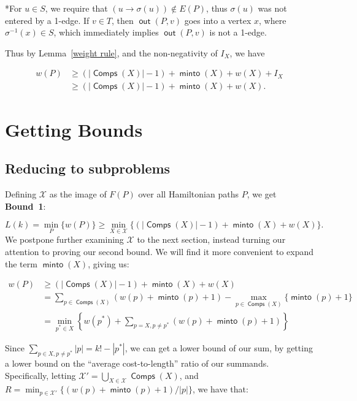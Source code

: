 \documentclass{article}
\DeclareMathOperator{\minto}{\bm{\mathsf{minto}}}
\DeclareMathOperator{\out}{\bm{\mathsf{out}}}
\DeclareMathOperator{\Comp}{\bm{\mathsf{Comps}}}
\newcommand{\edit}[1]{}%
\newcommand{\dc}[1]{}%
\begin{document}
*For $u \in S$, we require that $(u \to \sigma(u)) \not \in E(P)$, thus $\sigma(u)$ was not entered by a 1-edge. If $v \in T$, then $\out(P,v)$ goes into a vertex $x$, where $\sigma^{-1}(x) \in S$, which immediately implies $\out(P,v)$ is not a 1-edge.

\vspace{1.75em}

Thus by Lemma~\ref{weight rule}, and the non-negativity of $I_X$, we have

\begin{align*} w(P) &\geq (|\Comp(X)|-1)+\minto(X)+w(X)+I_X\\
&\geq (|\Comp(X)|-1)+\minto(X)+w(X).\end{align*}

\section{Getting Bounds} \label{reductions}

\subsection{Reducing to subproblems} \label{to subproblems}

Defining $\mathcal{X}$ as the image of $F(P)$ over all Hamiltonian paths $P$, we get \textbf{Bound~1}\dc{ label/ref}:

\[L(k) = \min_{P} \{w(P)\} \geq \min_{X \in \mathcal{X}} \{(|\Comp(X)|-1) + \minto(X) + w(X)\}.\]
We postpone further examining $\mathcal{X}$ to the next section, instead turning our attention to proving our second bound. We will find it more convenient to expand the term $\minto(X)$, giving us:

\begin{align*}
    w(P) &\geq (|\Comp(X)|-1) + \minto(X) + w(X) \\
    &= \sum_{p \in \Comp(X)} (w(p)+\minto(p)+1) - \max_{p \in \Comp(X)}\{\minto(p)+1\} \\
    &= \min_{p^* \in X}\left\{w(p^*) + \sum_{p = X, p \neq p^*} (w(p)+\minto(p)+1)\right\}
\end{align*}

Since $\displaystyle \sum_{p \in X, p \neq p^*} |p| = k!-|p^*|$, we can get a lower bound of our sum, by getting a lower bound on the  ``average cost-to-length'' ratio of our summands. Specifically, letting $\displaystyle \mathcal{X}' = \bigcup_{X \in \mathcal{X}} \Comp(X)$, and $\displaystyle  R = \min_{p \in \mathcal{X}'}\{(w(p)+\minto(p)+1)/|p|\}$, we have that:\edit{ should probably specify that $p^*$ is fixed after being chosen in the top equation}\dc{ define $p^*$ outside, like ``let $p^*$ be the path which minimizes ...''}
\end{document}
